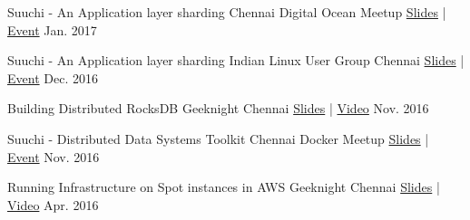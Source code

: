 



\begin{cvhonors}

  \cvhonor
    {Suuchi - An Application layer sharding} %
    {Chennai Digital Ocean Meetup} %
    {\href{https://speakerdeck.com/ashwanthkumar/suuchi-application-layer-sharding}{Slides} | \href{https://www.meetup.com/DigitalOceanChennai/events/236495174/}{Event}} %
    {Jan. 2017} %

  \cvhonor
    {Suuchi - An Application layer sharding} %
    {Indian Linux User Group Chennai} %
    {\href{https://speakerdeck.com/ashwanthkumar/suuchi-application-layer-sharding}{Slides} | \href{https://www.meetup.com/ILUG-C/events/233660958/}{Event}} %
    {Dec. 2016} %

  \cvhonor
    {Building Distributed RocksDB} %
    {Geeknight Chennai} %
    {\href{http://bit.ly/distributed-rocksdb}{Slides} | \href{https://www.youtube.com/watch?v=PSCa9_Avne0}{Video}} %
    {Nov. 2016} %

  \cvhonor
    {Suuchi - Distributed Data Systems Toolkit} %
    {Chennai Docker Meetup} %
    {\href{http://bit.ly/suuchi-toolkit}{Slides} | \href{https://www.meetup.com/docker-Chennai/events/235155974/}{Event}} %
    {Nov. 2016} %

  \cvhonor
    {Running Infrastructure on Spot instances in AWS} %
    {Geeknight Chennai} %
    {\href{http://j.mp/to-matsya-geeknight}{Slides} | \href{https://www.youtube.com/watch?v=qeBV9JRoTOA}{Video}} %
    {Apr. 2016} %

\end{cvhonors}


